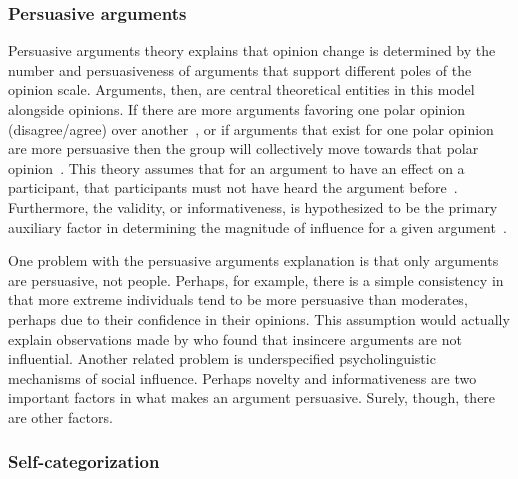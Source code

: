 \subsubsection{Persuasive arguments}

Persuasive arguments theory explains that opinion change is determined by the number and persuasiveness of 
arguments that support different poles of the opinion scale. Arguments, then,
are central theoretical entities in this model alongside opinions. If there are more
arguments favoring one polar opinion (disagree/agree) over another~\cite{Ebbesen1974}, or if
arguments that exist for one polar opinion are more persuasive 
then the group will collectively move towards that 
polar opinion~\cite{Vinokur1974,Burnstein1977}. This theory assumes that for an argument to have an effect
on a participant, that participants must not have heard the argument 
before~\cite[see Equation on p. 96]{Bishop1974}. Furthermore, the validity,
or informativeness, is hypothesized to be the primary auxiliary factor in 
determining the magnitude of influence for a given argument~\cite{Vinokur1978}. 

One problem with the persuasive arguments explanation is that only arguments 
are persuasive, not people. Perhaps, for example, there is a simple 
consistency in that more extreme individuals tend to be more persuasive than moderates, 
perhaps due to their confidence in their opinions. This assumption would actually 
explain observations made by  who 
found that insincere arguments are not influential.
Another related problem is underspecified
psycholinguistic mechanisms of social influence. Perhaps novelty and 
informativeness are two important factors in what makes an argument persuasive.
Surely, though, there are other factors.  

\subsubsection{Self-categorization}

